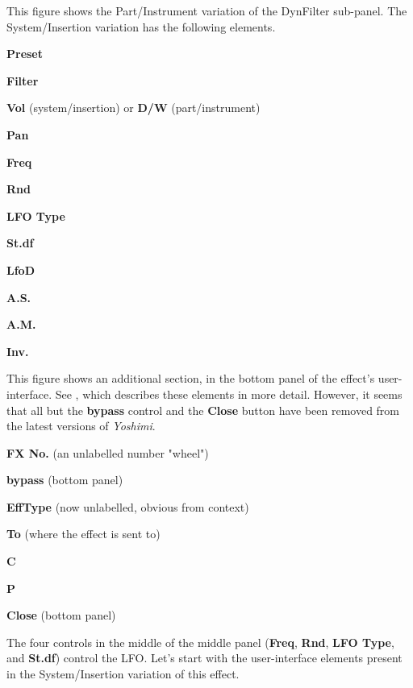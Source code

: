    This figure shows the Part/Instrument variation of the DynFilter sub-panel.
   The System/Insertion variation has the following elements.

   \begin{enumber}
      \item \textbf{Preset}
      \item \textbf{Filter}
      \item \textbf{Vol} (system/insertion) or \textbf{D/W} (part/instrument)
      \item \textbf{Pan}
      \item \textbf{Freq}
      \item \textbf{Rnd}
      \item \textbf{LFO Type}
      \item \textbf{St.df}
      \item \textbf{LfoD}
      \item \textbf{A.S.}
      \item \textbf{A.M.}
      \item \textbf{Inv.}
   \end{enumber}

   This figure shows an additional section, in the bottom panel of the effect's
   user-interface.
   See , which
   describes these elements in more detail.
   However, it seems that all but the \textbf{bypass} control and
   the \textbf{Close} button have been removed
   from the latest versions of \textsl{Yoshimi}.

   \begin{enumber}
      \item \textbf{FX No.} (an unlabelled number "wheel")
      \item \textbf{bypass} (bottom panel)
      \item \textbf{EffType} (now unlabelled, obvious from context)
      \item \textbf{To} (where the effect is sent to)
      \item \textbf{C}
      \item \textbf{P}
      \item \textbf{Close} (bottom panel)
   \end{enumber}

   The four controls in the middle of the middle panel
   (\textbf{Freq}, \textbf{Rnd}, \textbf{LFO Type}, and \textbf{St.df})
   control the LFO.
   Let's start with the user-interface elements present in the
   System/Insertion variation of this effect.

